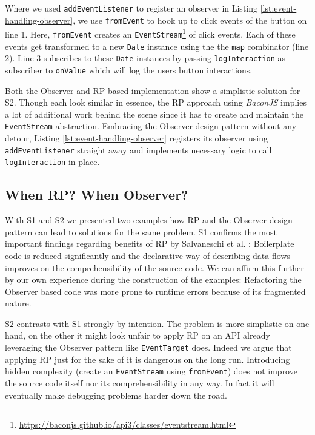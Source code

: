 \documentclass[12pt,a4paper]{article}
\begin{document}
Where we used \texttt{addEventListener} to register an observer in Listing \ref{lst:event-handling-observer}, we use \texttt{fromEvent} to hook up to click events of the button on line 1. Here, \texttt{fromEvent} creates an \texttt{EventStream}\footnote{\url{https://baconjs.github.io/api3/classes/eventstream.html}} of click events. Each of these events get transformed to a new \texttt{Date} instance using the the \texttt{map} combinator (line 2). Line 3 subscribes to these \texttt{Date} instances by passing \texttt{logInteraction} as subscriber to \texttt{onValue} which will log the users button interactions.

Both the Observer and RP based implementation show a simplistic solution for S2. Though each look similar in essence, the RP approach using \emph{BaconJS} implies a lot of additional work behind the scene since it has to create and maintain the \texttt{EventStream} abstraction. Embracing the Observer design pattern without any detour, Listing \ref{lst:event-handling-observer} registers its observer using \texttt{addEventListener} straight away and implements necessary logic to call \texttt{logInteraction} in place.


\subsection{When RP? When Observer?}
\label{sec:when-rp-when-observer}

With S1 and S2 we presented two examples how RP and the Observer design pattern can lead to solutions for the same problem. S1 confirms the most important findings regarding benefits of RP by Salvaneschi et al. \cite{7827078}: Boilerplate code is reduced significantly and the declarative way of describing data flows improves on the comprehensibility of the source code. We can affirm this further by our own experience during the construction of the examples: Refactoring the Observer based code was more prone to runtime errors because of its fragmented nature.

S2 contrasts with S1 strongly by intention. The problem is more simplistic on one hand, on the other it might look unfair to apply RP on an API already leveraging the Observer pattern like \texttt{EventTarget} does. Indeed we argue that applying RP just for the sake of it is dangerous on the long run. Introducing hidden complexity (create an \texttt{EventStream} using \texttt{fromEvent}) does not improve the source code itself nor its comprehensibility in any way. In fact it will eventually make debugging problems harder down the road.
\end{document}
